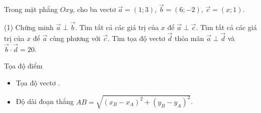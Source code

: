 \begin{vd}%
    Trong mặt phẳng $Oxy$, cho ba vectơ $\overrightarrow{a}=(1;3)$, $\overrightarrow{b}=(6;-2)$, $\overrightarrow{c}=(x;1)$.
    \begin{tasks}(1)
        \task Chứng minh $\overrightarrow{a}\perp \overrightarrow{b}$.
        \task Tìm tất cả các giá trị của $x$ để $\overrightarrow{a}\perp \overrightarrow{c}$.
        \task Tìm tất cả các giá trị của $x$ để $\overrightarrow{a}$ cùng phương với $\overrightarrow{c}$.
        \task Tìm tọa độ vectơ $\overrightarrow{d}$ thỏa mãn $\overrightarrow{a}\perp \overrightarrow{d}$ và $\overrightarrow{b}\cdot\overrightarrow{d}=20$.
    \end{tasks}
\end{vd}
\begin{dang}{Tọa độ điểm}
    \begin{itemize}
        \item [\ding{172}] Tọa độ vectơ .
        \item [\ding{173}] Độ dài đoạn thẳng $\boxed{AB=\sqrt{(x_B-x_A)^2+(y_B-y_A)^2}}$.
    \end{itemize}
\end{dang}

